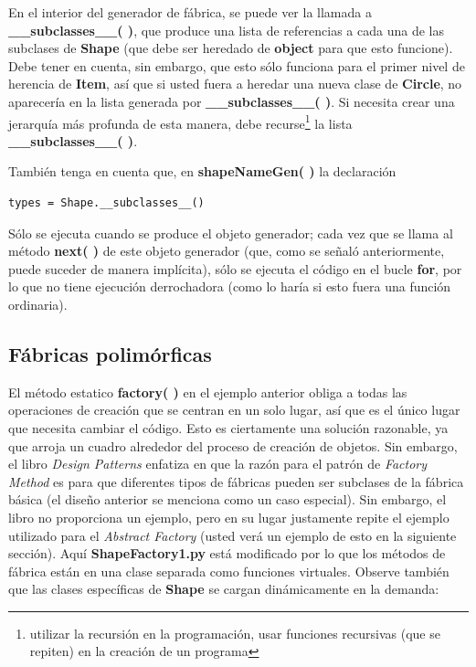 \documentclass{article}
\begin{document}
En el interior del generador de fábrica, se puede ver la llamada a \textbf{\_\_subclasses\_\_( )}, que produce una lista de referencias a cada una de las subclases de \textbf{Shape} (que debe ser heredado de \textbf{object} para que esto funcione). Debe tener en cuenta, sin embargo, que esto sólo funciona para el primer nivel de herencia de \textbf{Item}, así que si usted fuera a heredar una nueva clase de \textbf{Circle}, no aparecería en la lista generada por \textbf{\_\_subclasses\_\_( )}. Si necesita crear una jerarquía más profunda de esta manera, debe recurse\footnote{utilizar la recursión en la programación, usar funciones recursivas (que se repiten) en la creación de un programa} la lista \textbf{\_\_subclasses\_\_( )}.   \newline

También tenga en cuenta que, en \textbf{shapeNameGen( )} la declaración   \newline

\begin{lstlisting}
types = Shape.__subclasses__()
\end{lstlisting}

Sólo se ejecuta cuando se produce el objeto generador; cada vez que se llama al método \textbf{next( )} de este objeto generador (que, como se señaló anteriormente, puede suceder de manera implícita), sólo se ejecuta el código en el bucle \textbf{for}, por lo que no tiene ejecución derrochadora (como lo haría si esto fuera una función ordinaria).  \newline

\subsection{Fábricas polimórficas}

El método estatico \textbf{ factory( )} en el ejemplo anterior obliga a todas las operaciones de creación que se centran en un solo lugar, así que es el único lugar que necesita cambiar el código. Esto es ciertamente una solución razonable, ya que arroja un cuadro alrededor del proceso de creación de objetos. Sin embargo, el libro \textit{Design Patterns} enfatiza en que la razón para el patrón de \textit{Factory Method} es para que diferentes tipos de fábricas pueden ser subclases de la fábrica básica (el diseño anterior se menciona como un caso especial). Sin embargo, el libro no proporciona un ejemplo, pero en su lugar justamente repite el ejemplo utilizado para el \textit{Abstract Factory} (usted verá un ejemplo de esto en la siguiente sección). Aquí \textbf{ShapeFactory1.py} está modificado por lo que los métodos de fábrica están en una clase separada como funciones virtuales. Observe también que las clases específicas de \textbf{Shape} se cargan dinámicamente en la demanda:    \newline
\end{document}
